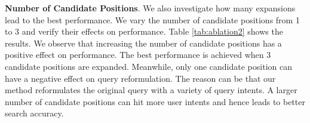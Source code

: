 \documentclass[sigconf,screen]{acmart}
\begin{document}
\smallskip \textbf{Number of Candidate Positions}. We also investigate how many expansions lead to the best performance. We vary the number of candidate positions from 1 to 3 and verify their effects on performance.
Table \ref{tab:ablation2} shows the results. We observe that increasing the number of candidate positions has a positive effect on performance. 
The best performance is achieved when 3 candidate positions are expanded. Meanwhile, only one candidate position can have a negative effect on query reformulation. 
The reason can be that our method reformulates the original query with a variety of query intents. 
A larger number of candidate positions can hit more user intents and hence leads to better search accuracy. 


\end{document}
